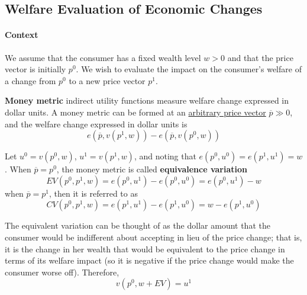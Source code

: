 \documentclass{article}
\begin{document}
 		\subsection{Welfare Evaluation of Economic Changes}
 			\paragraph{Context}We assume that the consumer has a fixed wealth level $w > 0$ and that the price vector is initially $p^0$. We wish to evaluate the impact on the consumer's welfare of a change from $p^0$ to a new price vector $p^1$.
 			
 			\begin{definition}
 				\textbf{Money metric} indirect utility functions measure welfare change expressed in dollar units. A money metric can be formed at an \ul{arbitrary price vector} $\overline{p} \gg 0$, and the welfare change expressed in dollar units is
 				\begin{equation}
 					e\left(\overline{p}, v\left(p^{1}, w\right)\right)-e\left(\overline{p}, v\left(p^{0}, w\right)\right)
 				\end{equation}
 			\end{definition}
 			
 			\begin{definition}
 				Let $u^0 = v(p^0, w)$, $u^1 = v(p^1, w)$, and noting that $e(p^0, u^0) = e(p^1, u^1) = w$.
 				When $\overline{p} = p^0$, the money metric is called \textbf{equivalence variation}
 				\begin{equation}
 					EV \left(p^{0}, p^{1}, w\right)=e\left(p^{0}, u^{1}\right)-e\left(p^{0}, u^{0}\right)=e\left(p^{0}, u^{1}\right)-w
 				\end{equation}
 				when $\overline{p} = p^1$, then it is referred to as
 				\begin{equation}
 					CV\left(p^{0}, p^{1}, w\right)=e\left(p^{1}, u^{1}\right)-e\left(p^{1}, u^{0}\right)=w-e\left(p^{1}, u^{0}\right)
 				\end{equation}
 			\end{definition}
 			
 			\begin{remark}[Interpretation of EV]
 				The equivalent variation can be thought of as the dollar amount that the consumer would be indifferent about accepting in lieu of the price change; that is, it is the change in her wealth that would be equivalent to the price change in terms of its welfare impact (so it is negative if the price change would make the consumer worse off). Therefore,
 				\begin{equation}
 					v(p^0, w+EV) = u^1
 				\end{equation}
 			\end{remark}
 			
\end{document}
